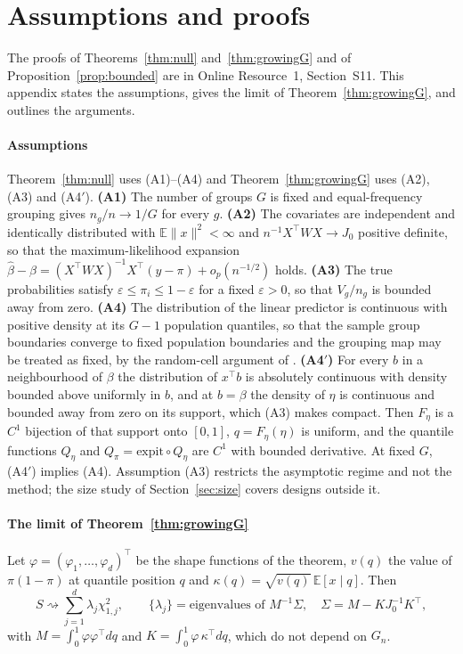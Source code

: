 \appendix

\section{Assumptions and proofs}\label{app:proofs}

The proofs of Theorems~\ref{thm:null} and~\ref{thm:growingG} and of Proposition~\ref{prop:bounded} are
in Online Resource~1, Section~S11. This appendix states the assumptions, gives the limit of
Theorem~\ref{thm:growingG}, and outlines the arguments.

\paragraph{Assumptions} Theorem~\ref{thm:null} uses (A1)--(A4) and Theorem~\ref{thm:growingG} uses
(A2), (A3) and (A4$'$). \textbf{(A1)} The number of groups $G$ is fixed and equal-frequency grouping
gives $n_g/n\to1/G$ for every $g$. \textbf{(A2)} The covariates are independent and identically
distributed with $\mathbb{E}\|x\|^2<\infty$ and $n^{-1}X^\top WX\to J_0$ positive definite, so that
the maximum-likelihood expansion $\hat\beta-\beta=(X^\top WX)^{-1}X^\top(y-\pi)+o_p(n^{-1/2})$
holds. \textbf{(A3)} The true probabilities satisfy $\varepsilon\le\pi_i\le1-\varepsilon$ for a fixed
$\varepsilon>0$, so that $V_g/n_g$ is bounded away from zero. \textbf{(A4)} The distribution of the
linear predictor is continuous with positive density at its $G-1$ population quantiles, so that the
sample group boundaries converge to fixed population boundaries and the grouping map may be treated
as fixed, by the random-cell argument of \citet{Moore1975}. \textbf{(A4$'$)} For every $b$ in a neighbourhood of $\beta$ the distribution of $x^\top b$ is
absolutely continuous with density bounded above uniformly in $b$, and at $b=\beta$ the density of
$\eta$ is continuous and bounded away from zero on its support, which (A3) makes compact. Then
$F_\eta$ is a $C^1$ bijection of that support onto $[0,1]$, $q=F_\eta(\eta)$ is uniform, and the
quantile functions $Q_\eta$ and $Q_\pi=\mathrm{expit}\circ Q_\eta$ are $C^1$ with bounded
derivative. At fixed $G$, (A4$'$) implies (A4). Assumption (A3) restricts the asymptotic regime and
not the method; the size study of Section~\ref{sec:size} covers designs outside it.

\paragraph{The limit of Theorem~\ref{thm:growingG}} Let $\varphi=(\varphi_1,\dots,\varphi_d)^\top$ be
the shape functions of the theorem, $v(q)$ the value of $\pi(1-\pi)$ at quantile position $q$ and
$\kappa(q)=\sqrt{v(q)}\,\mathbb{E}[x\mid q]$. Then
\begin{equation}\label{eq:growingG}
S\rightsquigarrow\sum_{j=1}^d\lambda_j\chi^2_{1,j},\qquad \{\lambda_j\}=\text{eigenvalues of }
M^{-1}\Sigma,\quad \Sigma=M-KJ_0^{-1}K^\top,
\end{equation}
with $M=\int_0^1\varphi\varphi^\top dq$ and $K=\int_0^1\varphi\,\kappa^\top dq$, which do not depend
on $G_n$.

